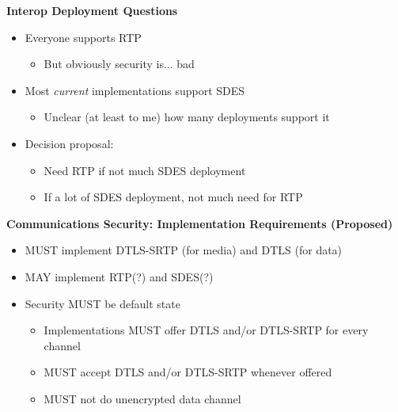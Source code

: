\documentclass[helvetica]{seminar}
\newcommand{\heading}[1]{%
  \begin{center} 
    \large\bf 
    #1 
  \end{center} 
  \vspace{.4 in}}
\begin{document}
\begin{slide}
\heading{Interop Deployment Questions}

\begin{itemize}
\item Everyone supports RTP
  \begin{itemize}
  \item But obviously security is... bad
  \end{itemize}

\item Most \emph{current} implementations support SDES
  \begin{itemize}
  \item Unclear (at least to me) how many deployments support it
  \end{itemize}

\item Decision proposal:
  \begin{itemize}
  \item Need RTP if not much SDES deployment
  \item If a lot of SDES deployment, not much need for RTP
  \end{itemize}


\end{itemize}

\end{slide}


\begin{slide}
\heading{Communications Security: Implementation Requirements (Proposed)}

\begin{itemize}
\item MUST implement DTLS-SRTP (for media) and DTLS (for data) 
\item MAY implement RTP(?) and SDES(?)
\item Security MUST be default state
  \begin{itemize}
  \item Implementations MUST offer DTLS and/or DTLS-SRTP for every channel
  \item MUST accept DTLS and/or DTLS-SRTP whenever offered 
  \item MUST not do unencrypted data channel
  \end{itemize}
\end{itemize}

\end{slide}



\centerslidestrue
\end{document}

